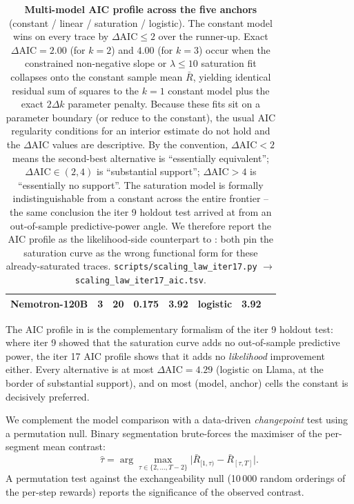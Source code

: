 \begin{table}[t]
\begin{tabular}{lrrrrrrl}
    Nemotron-120B         & 3 & 20 & 0.175 & 3.92 & logistic            & 3.92 \\
    \bottomrule
  \end{tabular}
  \caption{\textbf{Multi-model AIC profile across the five
    anchors} (constant / linear / saturation / logistic).
    The constant model wins on every trace by $\Delta\text{AIC}
    \le 2$ over the runner-up.  Exact $\Delta\text{AIC} = 2.00$
    (for $k=2$) and $4.00$ (for $k=3$) occur when the constrained
    non-negative slope or $\lambda \le 10$ saturation fit collapses
    onto the constant sample mean $\bar R$, yielding identical
    residual sum of squares to the $k=1$ constant model plus the
    exact $2\Delta k$ parameter penalty.  Because these fits sit on a
    parameter boundary (or reduce to the constant), the usual AIC
    regularity conditions for an interior estimate do not hold and the
    $\Delta$AIC values are descriptive.  By the
    \citet{burnham2002model} convention, $\Delta\text{AIC} < 2$
    means the second-best alternative is ``essentially equivalent'';
    $\Delta\text{AIC} \in (2, 4)$ is ``substantial support'';
    $\Delta\text{AIC} > 4$ is ``essentially no support''.  The
    saturation model is formally indistinguishable from a constant
    across the entire frontier -- the same conclusion the iter 9
    holdout test arrived at from an out-of-sample predictive-power
    angle.  We therefore report the AIC profile as the
    likelihood-side counterpart to :
    both pin the saturation curve as the wrong functional form for
    these already-saturated traces.
    \texttt{scripts/scaling\_law\_iter17.py} $\to$
    \texttt{scaling\_law\_iter17\_aic.tsv}.}
  \label{tab:scaling-iter17-aic}
\end{table}

The AIC profile in  is the
complementary formalism of the iter 9 holdout test: where
iter 9 showed that the saturation curve adds no out-of-sample
predictive power, the iter 17 AIC profile shows that it adds no
\emph{likelihood} improvement either.  Every alternative is at
most $\Delta\text{AIC} = 4.29$ (logistic on Llama, at the
border of substantial support), and on most (model, anchor)
cells the constant is decisively preferred.

We complement the model comparison with a data-driven
\emph{changepoint} test using a permutation null.  Binary
segmentation brute-forces the maximiser of the per-segment
mean contrast:
\begin{equation}
  \label{eq:changepoint}
  \hat\tau
    = \arg\max_{\tau \in \{2, \dots, T-2\}}
       \bigl|\bar R_{[1,\tau)} - \bar R_{[\tau,T]}\bigr|.
\end{equation}
A permutation test against the exchangeability null (10\,000
random orderings of the per-step rewards) reports the
significance of the observed contrast.

